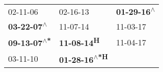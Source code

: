 \begin{supertabular}{lll}
                   02-11-06\textsuperscript{} &                     02-16-13\textsuperscript{} &  \textbf{01-29-16\textsuperscript{$\wedge$}} \\
  \textbf{03-22-07\textsuperscript{$\wedge$}} &                     11-07-14\textsuperscript{} &                   11-03-17\textsuperscript{} \\
 \textbf{09-13-07\textsuperscript{$\wedge$*}} &           \textbf{11-08-14\textsuperscript{H}} &                   11-04-17\textsuperscript{} \\
                   03-11-10\textsuperscript{} &  \textbf{01-28-16\textsuperscript{$\wedge$*H}} &                                              \\
\end{supertabular}
